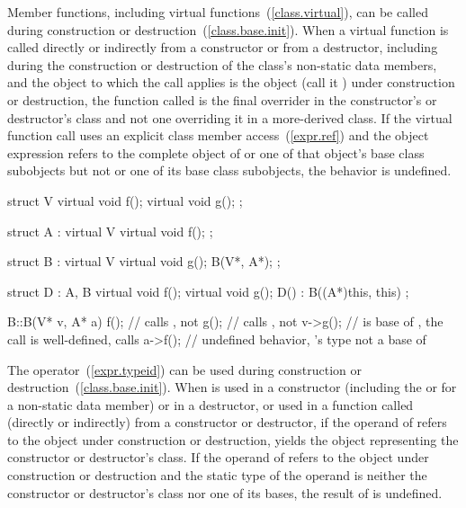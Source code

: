 \pnum
{}%
%
%
%
Member functions, including virtual functions~(\ref{class.virtual}), can be called
during construction or destruction~(\ref{class.base.init}).
When a virtual function is called directly or indirectly from a constructor
or from a destructor,
including during the construction or destruction of the class's non-static data
members,
and the object to which the call applies is the object (call it ) under construction or
destruction,
the function called is the
final overrider in the constructor's or destructor's class and not one
overriding it in a more-derived class.
If the virtual function call uses an explicit class member access~(\ref{expr.ref})
and the object expression refers to
the complete object of  or one of that object's base class subobjects
but not  or one of its base class subobjects, the behavior
is undefined.
\enterexample

\begin{codeblock}
struct V {
  virtual void f();
  virtual void g();
};

struct A : virtual V {
  virtual void f();
};

struct B : virtual V {
  virtual void g();
  B(V*, A*);
};

struct D : A, B {
  virtual void f();
  virtual void g();
  D() : B((A*)this, this) { }
};

B::B(V* v, A* a) {
  f();              // calls , not 
  g();              // calls , not 
  v->g();           //  is base of , the call is well-defined, calls 
  a->f();           // undefined behavior, 's type not a base of 
}
\end{codeblock}
\exitexample

\pnum
{}%
%
%
%
The
operator~(\ref{expr.typeid}) can be used during construction or destruction~(\ref{class.base.init}).
When
is used in a constructor (including the
 or 
for a non-static data member)
or in a destructor, or used in a function called (directly or indirectly) from
a constructor or destructor, if the operand of
refers to the object under construction or destruction,
yields the
object representing the constructor or destructor's class.
If the operand of
refers to the object under construction or destruction and the static type of
the operand is neither the constructor or destructor's class nor one of its
bases, the result of
is undefined.


